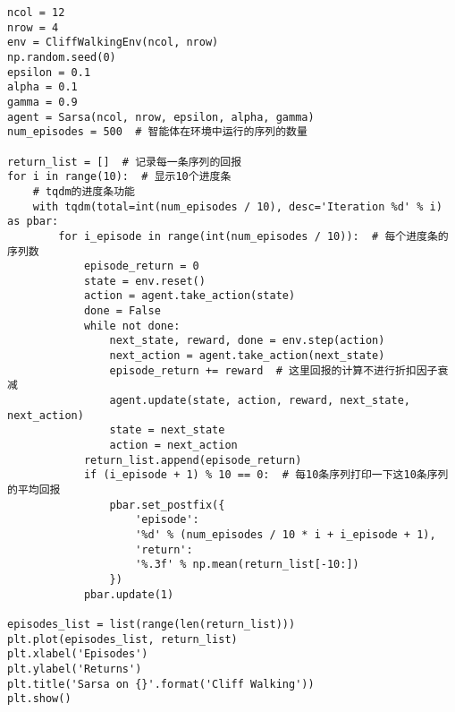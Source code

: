 \begin{lstlisting}
ncol = 12
nrow = 4
env = CliffWalkingEnv(ncol, nrow)
np.random.seed(0)
epsilon = 0.1
alpha = 0.1
gamma = 0.9
agent = Sarsa(ncol, nrow, epsilon, alpha, gamma)
num_episodes = 500  # 智能体在环境中运行的序列的数量

return_list = []  # 记录每一条序列的回报
for i in range(10):  # 显示10个进度条
    # tqdm的进度条功能
    with tqdm(total=int(num_episodes / 10), desc='Iteration %d' % i) as pbar:
        for i_episode in range(int(num_episodes / 10)):  # 每个进度条的序列数
            episode_return = 0
            state = env.reset()
            action = agent.take_action(state)
            done = False
            while not done:
                next_state, reward, done = env.step(action)
                next_action = agent.take_action(next_state)
                episode_return += reward  # 这里回报的计算不进行折扣因子衰减
                agent.update(state, action, reward, next_state, next_action)
                state = next_state
                action = next_action
            return_list.append(episode_return)
            if (i_episode + 1) % 10 == 0:  # 每10条序列打印一下这10条序列的平均回报
                pbar.set_postfix({
                    'episode':
                    '%d' % (num_episodes / 10 * i + i_episode + 1),
                    'return':
                    '%.3f' % np.mean(return_list[-10:])
                })
            pbar.update(1)

episodes_list = list(range(len(return_list)))
plt.plot(episodes_list, return_list)
plt.xlabel('Episodes')
plt.ylabel('Returns')
plt.title('Sarsa on {}'.format('Cliff Walking'))
plt.show()
\end{lstlisting}

